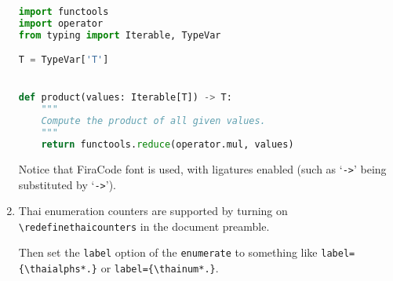 \begin{enumerate}
\begin{lstlisting}[language=python]
import functools
import operator
from typing import Iterable, TypeVar

T = TypeVar['T']


def product(values: Iterable[T]) -> T:
    """
    Compute the product of all given values.
    """
    return functools.reduce(operator.mul, values)
\end{lstlisting}
    Notice that FiraCode font is used, with ligatures enabled 
    (such as ‘\texttt{-{\vphantom{!}}>}’ being substituted by ‘\texttt{->}’).

\item Thai enumeration counters are supported by turning on 
    \lstinline"\redefinethaicounters" in the document preamble.
    
    Then set the \lstinline"label" option of the \lstinline"enumerate"
    to something like \lstinline"label={\thaialphs*.}" or \lstinline"label={\thainum*.}".


\end{enumerate}
